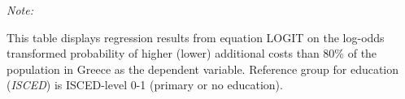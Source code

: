 \begin{table}[htbp!]
\begin{adjustbox}{width = 1\textwidth, max height = 0.95\textheight, center}
\begin{threeparttable}[b]
         \begin{tablenotes}\item \medskip \textit{Note:}
            \item This table displays regression results from equation LOGIT on the log-odds transformed probability of higher (lower) additional costs than 80\% of the population in Greece as the dependent variable. Reference group for education (\textit{ISCED}) is ISCED-level 0-1 (primary or no education).
         \end{tablenotes}
      \end{threeparttable}
   \end{adjustbox}
\end{table}


